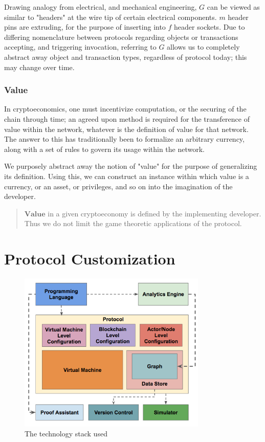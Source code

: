 \documentclass[12pt, titlepage, twocolumn]{report}
\begin{document}
Drawing analogy from electrical, and mechanical engineering, \(G\) can be viewed as similar to "headers" at the wire tip of certain electrical components. \(m\) header pins are extruding, for the purpose of inserting into \(f\) header sockets. Due to differing nomenclature between protocols regarding objects or transactions accepting, and triggering invocation, referring to \(G\) allows us to completely abstract away object and transaction types, regardless of protocol today; this may change over time.

\subsection{Value}
In cryptoeconomics, one must incentivize computation, or the securing of the chain through time; an agreed upon method is required for the transference of value within the network, whatever is the definition of value for that network. The answer to this has traditionally been to formalize an arbitrary currency, along with a set of rules to govern its usage within the network.

We purposely abstract away the notion of "value" for the purpose of generalizing its definition. Using this, we can construct an instance within which value is a currency, or an asset, or privileges, and so on into the imagination of the developer. 

\begin{quotation}
  \(\boldsymbol{Value}\) in a given cryptoeconomy is defined by the implementing developer. Thus we do not limit the game theoretic applications of the protocol.
 \end{quotation}



\chapter{Protocol Customization}

\begin{figure}[ht]
\centering
	\includegraphics[width=0.8\textwidth]{k_architecture}
	\caption{The technology stack used}
	\label{k_architecture}
\end{figure}
\end{document}
